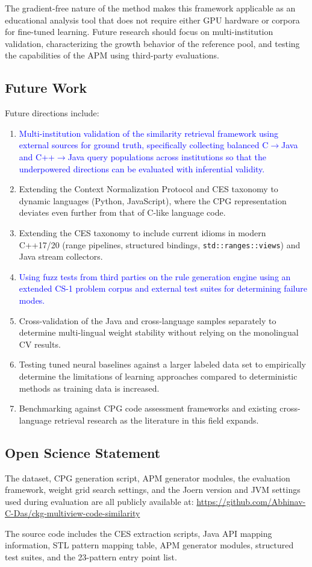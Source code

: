 The gradient-free nature of the method makes this framework applicable as an educational analysis tool that does not require either GPU hardware or corpora for fine-tuned learning. Future research should focus on multi-institution validation, characterizing the growth behavior of the reference pool, and testing the capabilities of the APM using third-party evaluations.

\subsection{Future Work}
\label{subsec:future_work}

Future directions include:
\begin{enumerate}
    \item \textcolor{blue}{Multi-institution validation of the similarity retrieval framework using external sources for ground truth, specifically collecting balanced C$\rightarrow$Java and C++$\rightarrow$Java query populations across institutions so that the underpowered directions can be evaluated with inferential validity.}
    \item Extending the Context Normalization Protocol and CES taxonomy to dynamic languages (Python, JavaScript), where the CPG representation deviates even further from that of C-like language code.
    \item Extending the CES taxonomy to include current idioms in modern C++17/20 (range pipelines, structured bindings, \texttt{std::ranges::views}) and Java stream collectors.
    \item \textcolor{blue}{Using fuzz tests from third parties on the rule generation engine using an extended CS-1 problem corpus and external test suites for determining failure modes.}
    \item Cross-validation of the Java and cross-language samples separately to determine multi-lingual weight stability without relying on the monolingual CV results.
    \item Testing tuned neural baselines against a larger labeled data set to empirically determine the limitations of learning approaches compared to deterministic methods as training data is increased.
    \item Benchmarking against CPG code assessment frameworks and existing cross-language retrieval research as the literature in this field expands.
\end{enumerate}

\subsection{Open Science Statement}

The dataset, CPG generation script, APM generator modules, the evaluation framework, weight grid search settings, and the Joern version and JVM settings used during evaluation are all publicly available at:
\url{https://github.com/Abhinav-C-Das/ckg-multiview-code-similarity}

The source code includes the CES extraction scripts, Java API mapping information, STL pattern mapping table, APM generator modules, structured test suites, and the 23-pattern entry point list.
